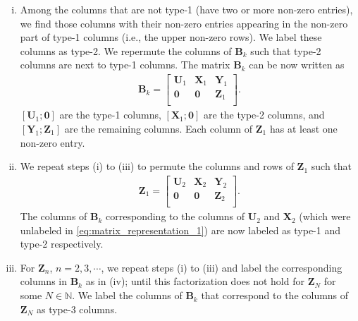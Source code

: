 \documentclass[12pt]{article}
\newcommand{\bB}{\mathbf{B}}
\begin{document}
\begin{enumerate}[(i)]
    \item Among the columns that are not type-1 (have two or more non-zero entries), we find those columns with their non-zero entries appearing in the non-zero part of type-1 columns (i.e., the upper non-zero rows). We label these columns as type-2. We repermute the columns of $\bB_k$ such that type-2 columns are next to type-1 columns. The matrix $\bB_k$ can be now written as
    \begin{align} \label{eq:matrix_representation_1}
    \bB_k = 
    \begin{bmatrix}
    \mathbf{U}_1 & \mathbf{X}_1 & \mathbf{Y}_1 \\
    \mathbf{0} & \mathbf{0} & \mathbf{Z}_1 \\
    \end{bmatrix}.    
    \end{align}
    $[\mathbf{U}_1; \mathbf{0}]$ are the type-1 columns, $[\mathbf{X}_1;\mathbf{0}]$ are the type-2 columns, and $[\mathbf{Y}_1;\mathbf{Z}_1]$ are the remaining columns. Each column of $\mathbf{Z}_1$ has at least one non-zero entry.
    \item We repeat steps (i) to (iii) to permute the columns and rows of $\mathbf{Z}_1$ such that
    \begin{align}
    \mathbf{Z}_1 = 
    \begin{bmatrix}
    \mathbf{U}_2 & \mathbf{X}_2 & \mathbf{Y}_2 \\
    \mathbf{0} & \mathbf{0} & \mathbf{Z}_2 \\
    \end{bmatrix}.    
    \end{align}
    The columns of $\bB_k$ corresponding to the columns of $\mathbf{U}_2$ and $\mathbf{X}_2$ (which were unlabeled in \eqref{eq:matrix_representation_1}) are now labeled as type-1 and type-2 respectively. 
    \item For $\mathbf{Z}_n$, $n=2,3,\cdots$, we repeat steps (i) to (iii) and label the corresponding columns in $\bB_k$ as in (iv); until this factorization does not hold for $\mathbf{Z}_N$ for some $N\in\mathbb{N}$. We label the columns of $\bB_k$ that correspond to the columns of  $\mathbf{Z}_N$ as type-3 columns.
\end{enumerate}
\end{document}
